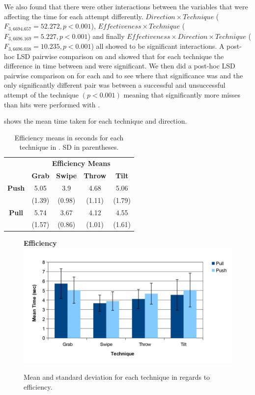 We also found that there were other interactions between the variables that were affecting the time for each attempt differently. 
$Direction \times Technique$  ($F_{3,6694.657} = 52.272, p < 0.001$), $Effectiveness \times Technique$  ($F_{3,6696.169} = 5.227, p < 0.001$) and finally $Effectiveness \times Direction \times Technique$  ($F_{3,6696.038} = 10.235, p < 0.001$) all showed to be significant interactions. 
A post-hoc LSD pairwise comparison on \direction and \technique showed that for each technique the difference in time between \push and \pull were significant.
We then did a post-hoc LSD pairwise comparison on \effectiveness for each \technique and \direction to see where that significance was and the only significantly different pair was between a successful and unsuccessful attempt of the \grab \pull technique $(p < 0.001)$ meaning that significantly more misses than hits were performed with \grab \pull.

 shows the mean time taken for each technique and direction.

\begin{table}[H]
	\centering
	\def\arraystretch{1}
		\begin{tabular}{c c c c c}
			& \multicolumn{4}{c}{\textbf{Efficiency Means}} \B \\
			\cline{2-5}
			& \textbf{Grab} & \textbf{Swipe} & \textbf{Throw} & \textbf{Tilt} \T\B \\ \hline
			\textbf{Push} & 5.05 & 3.9 & 4.68 & 5.06 \T \\ 
			& (1.39) & (0.98) & (1.11) & (1.79) \B \\ \hline
			\textbf{Pull} & 5.74 & 3.67 & 4.12 & 4.55 \T \\ 
			& (1.57) & (0.86) & (1.01) & (1.61) \B \\ \hline
		\end{tabular}
	\caption{Efficiency means in seconds for each technique in \target. SD in parentheses.}
	\label{tab:successRate}
\end{table}

\begin{figure}[H]{
	\centering
	\textbf{Efficiency}\\[4pt]
	\includegraphics[width = 1\columnwidth ]{images/time_graph.pdf}} 
	\caption{
		Mean and standard deviation for each technique in regards to efficiency.
	}
	\label{fig:efficiencyGraph}
\end{figure}

